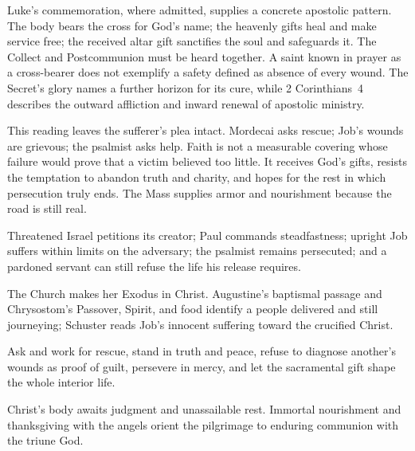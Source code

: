 Luke's commemoration, where admitted, supplies a concrete
apostolic pattern. The body bears the cross for God's name;
the heavenly gifts heal and make service free; the received
altar gift sanctifies the soul and safeguards it. The Collect
and Postcommunion must be heard together. A saint known in
prayer as a cross-bearer does not exemplify a safety defined
as absence of every wound. The Secret's glory names a further
horizon for its cure, while 2 Corinthians~4 describes the
outward affliction and inward renewal of apostolic ministry.

This reading leaves the sufferer's plea intact. Mordecai
asks rescue; Job's wounds are grievous; the psalmist asks
help. Faith is not a measurable covering whose failure
would prove that a victim believed too little. It receives
God's gifts, resists the temptation to abandon truth and
charity, and hopes for the rest in which persecution truly
ends. The Mass supplies armor and nourishment because
the road is still real.

\begin{fourSenses}
\item[Literal.] Threatened Israel petitions its creator; Paul commands
steadfastness; upright Job suffers within limits on the adversary;
the psalmist remains persecuted; and a pardoned servant can still
refuse the life his release requires.
\item[Allegorical.] The Church makes her Exodus in Christ. Augustine's
baptismal passage and Chrysostom's Passover, Spirit, and food identify
a people delivered and still journeying; Schuster reads Job's innocent
suffering toward the crucified Christ.
\item[Moral.] Ask and work for rescue, stand in truth and peace, refuse
to diagnose another's wounds as proof of guilt, persevere in mercy,
and let the sacramental gift shape the whole interior life.
\item[Anagogical.] Christ's body awaits judgment and unassailable rest.
Immortal nourishment and thanksgiving with the angels orient the
pilgrimage to enduring communion with the triune God.
\end{fourSenses}

\clearpage
